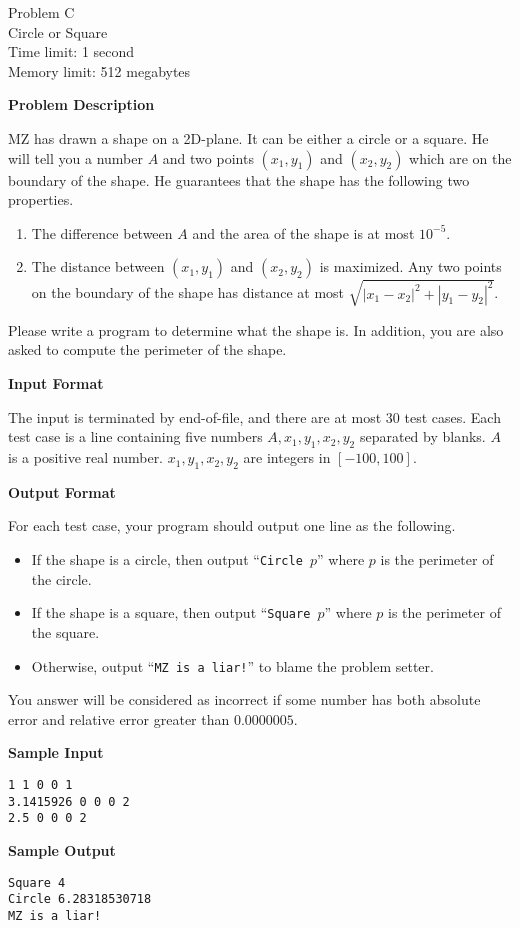 \documentclass[11pt]{article}
\begin{document}
\begin{center}
    {\LARGE Problem C}\\
    {\Large Circle or Square}\\
    {Time limit: 1 second}\\
    {Memory limit: 512 megabytes}
\end{center}

\textbf{\large Problem Description}

MZ has drawn a shape on a 2D-plane. It can be either a circle or a square. 
He will tell you a number $A$ and two points $(x_1,y_1)$ and $(x_2,y_2)$ 
which are on the boundary of the shape. He guarantees that the shape has the 
following two properties.
\begin{enumerate}
	\item The difference between $A$ and the area of the shape is at 
		most $10^{-5}$.
	\item The distance between $(x_1,y_1)$ and $(x_2,y_2)$ is maximized.
		Any two points on the boundary of the shape has distance at
		most $\sqrt{|x_1-x_2|^2+|y_1-y_2|^2}$.
\end{enumerate}
Please write a program to determine what the shape is.
In addition, you are also asked to compute the perimeter of the shape.

\textbf{\large Input Format}

The input is terminated by end-of-file, and there are at most 30 test cases.
Each test case is a line containing five numbers $A,x_1,y_1,x_2,y_2$
separated by blanks. $A$ is a positive real number. $x_1,y_1,x_2,y_2$ are 
integers in $[-100,100]$.

\textbf{\large Output Format}

For each test case, your program should output one line as the following.
\begin{itemize}
\item If the shape is a circle, then output ``\verb+Circle +$p$'' where $p$
	is the perimeter of the circle. 
\item If the shape is a square, then output ``\verb+Square +$p$'' where $p$ 
	is the perimeter of the square. 
\item Otherwise, output ``\verb+MZ is a liar!+'' to blame the problem 
	setter.
\end{itemize}
You answer will be considered as incorrect if some number has both absolute 
error and relative error greater than $0.0000005$.

\textbf{\large Sample Input}

\begin{verbatim}
1 1 0 0 1
3.1415926 0 0 0 2
2.5 0 0 0 2
\end{verbatim}

\textbf{\large Sample Output}
\begin{verbatim}
Square 4
Circle 6.28318530718
MZ is a liar!
\end{verbatim}
\end{document}
